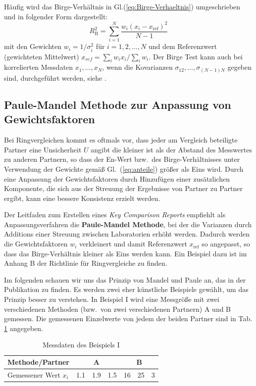 Häufig wird das Birge-Verhältnis in Gl.(\ref{eq:Birge-Verhaeltnis}) 
umgeschrieben und in folgender Form dargestellt:
\begin{equation}
R_\mathrm{B}^2 = \sum_{i=1}^N \frac{w_i (x_i - x_\mathrm{ref})^2}{N-1}
\end{equation}
mit den Gewichten $w_i = 1/\sigma_i^2$ für $i=1,2,\ldots, N$ und dem 
Referenzwert (gewichteten Mittelwert) $x_{ref}=\sum_i w_i x_i / \sum_i w_i$.
Der Birge Test kann auch bei korrelierten Messdaten $x_1,\ldots ,x_N$, wenn die 
Kovarianzen $\sigma_{12},\ldots, \sigma_{(N-1)N}$ gegeben sind, durchgeführt werden, siehe \cite{Kac08}.

\subsection{Paule-Mandel Methode zur Anpassung von Gewichtsfaktoren}

Bei Ringvergleichen kommt es oftmals vor, dass jeder am Vergleich beteiligte Partner eine
Unsicherheit $U$ angibt die kleiner ist als der Abstand des Messwertes zu anderen Partnern,
so dass der En-Wert bzw.\ des Birge-Verhältnisses unter Verwendung der Gewichte gemäß Gl.~(\ref{eq:anteile})
größer als Eins wird. Durch eine Anpassung der Gewichtsfaktoren durch Hinzufügen einer
zusätzlichen Komponente, die sich aus der Streuung der Ergebnisse von Partner zu Partner ergibt,
kann eine bessere Konsistenz erzielt werden.

Der Leitfaden zum Erstellen eines \textsl{Key Comparison Reports}
\cite{GuideKey} empfiehlt als Anpassungsverfahren die \textbf{Paule-Mandel Methode},
bei der die Varianzen durch Additions einer Streuung zwischen Laboratorien
erhöht werden. Dadurch werden die Gewichtsfaktoren $w_i$ verkleinert und damit Referenzwert 
$x_\mathrm{ref}$ so angepasst, so dass das Birge-Verhältnis kleiner als Eins werden kann.
Ein Beispiel dazu ist im Anhang B der Richtlinie für Ringvergleiche \cite{GuideKey} zu finden.

Im folgenden schauen wir uns das Prinzip von Mandel und Paule an, das 
in der Publikation \cite{Pau82} zu finden. Es werden zwei eher künstliche Beispiele gewählt, um das Prinzip besser zu verstehen. 
In Beispiel I wird eine Messgröße mit zwei verschiedenen Methoden (bzw.\ von zwei verschiedenen Partnern) A und B gemessen.
Die gemessenen Einzelwerte von jedem der beiden Partner sind in Tab. \ref*{tab:Beispiel_I}
angegeben.
\begin{table}[!htb]
	\caption{Messdaten des Beispiels I}
	\begin{center}
	\begin{tabular}{l| rrr |rrr}
		\hline 
		Methode/Partner & \multicolumn{3}{c}{A} \vline & \multicolumn{3}{c}{B} \\ \hline
		Gemessener Wert $x_i$ & 1.1 & 1.9 & 1.5 & 16 & 25 & 3 \\ \hline
	\end{tabular}
\end{center}
\label{tab:Beispiel_I}
\end{table}

